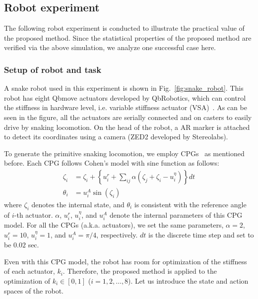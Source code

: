 \documentclass{bmcart}
\begin{document}
\subsection{Robot experiment}

The following robot experiment is conducted to illustrate the practical value of the proposed method.
Since the statistical properties of the proposed method are verified via the above simulation, we analyze one successful case here.

\subsubsection{Setup of robot and task}

A snake robot used in this experiment is shown in Fig.~\ref{fig:snake_robot}.
This robot has eight Qbmove actuators developed by QbRobotics, which can control the stiffness in hardware level, i.e. variable stiffness actuator (VSA)~\cite{catalano2011vsa}.
As can be seen in the figure, all the actuators are serially connected and on casters to easily drive by snaking locomotion.
On the head of the robot, a AR marker is attached to detect its coordinates using a camera (ZED2 developed by Stereolabs).

To generate the primitive snaking locomotion, we employ CPGs~\cite{cohen1982nature} as mentioned before.
Each CPG follows Cohen's model with sine function as follows:
\begin{align}
    \zeta_i &= \zeta_i + \left \{ u_i^r + \sum_{ij} \alpha(\zeta_j + \zeta_i - u_i^\eta) \right \} dt
    \label{eq:cpg_dyn} \\
    \theta_i &= u_i^A \sin(\zeta_i)
    \label{eq:cpg_out}
\end{align}
where $\zeta_i$ denotes the internal state, and $\theta_i$ is consistent with the reference angle of $i$-th actuator.
$\alpha$, $u_i^r$, $u_i^\eta$, and $u_i^A$ denote the internal parameters of this CPG model.
For all the CPGs (a.k.a. actuators), we set the same parameters, $\alpha = 2$, $u_i^r = 10$, $u_i^\eta = 1$, and $u_i^A = \pi / 4$, respectively.
$dt$ is the discrete time step and set to be $0.02$ sec.

Even with this CPG model, the robot has room for optimization of the stiffness of each actuator, $k_i$.
Therefore, the proposed method is applied to the optimization of $k_i \in [0, 1]$ ($i = 1, 2, \ldots, 8$).
Let us introduce the state and action spaces of the robot.
\end{document}
